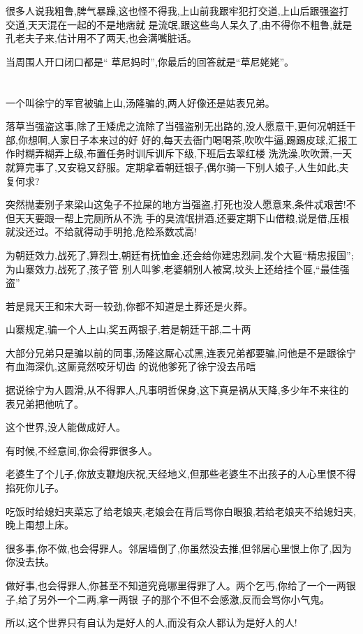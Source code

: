 ﻿\documentclass[12pt]{article}
\begin{document}
很多人说我粗鲁,脾气暴躁,这也怪不得我,上山前我跟牢犯打交道,上山后跟强盗打交道,天天混在一起的不是地痞就
是流氓,跟这些鸟人呆久了,由不得你不粗鲁,就是孔老夫子来,估计用不了两天,也会满嘴脏话。

当周围人开口闭口都是`` 草尼妈时'',你最后的回答就是``草尼姥姥''。
\section{}

一个叫徐宁的军官被骗上山,汤隆骗的,两人好像还是姑表兄弟。

落草当强盗这事,除了王矮虎之流除了当强盗别无出路的,没人愿意干,更何况朝廷干部,你想啊,人家日子本来过的好
好的,每天去衙门喝喝茶,吹吹牛逼,踢踢皮球,汇报工作时糊弄糊弄上级,布置任务时训斥训斥下级,下班后去翠红楼
洗洗澡,吹吹萧,一天就算完事了,又安稳又舒服。定期拿着朝廷银子,偶尔骑一下别人娘子,人生如此,夫复何求?

突然抛妻别子来梁山这兔子不拉屎的地方当强盗,打死也没人愿意来,条件忒艰苦!不但天天要跟一帮上完厕所从不洗
手的臭流氓拼酒,还要定期下山借粮,说是借,压根就没还过。不给就得动手明抢,危险系数忒高!

为朝廷效力,战死了,算烈士,朝廷有抚恤金,还会给你建忠烈祠,发个大匾``精忠报国'';为山寨效力,战死了,孩子管
别人叫爹,老婆躺别人被窝,坟头上还给挂个匾,``最佳强盗''

若是晁天王和宋大哥一较劲,你都不知道是土葬还是火葬。

山寨规定,骗一个人上山,奖五两银子,若是朝廷干部,二十两

大部分兄弟只是骗以前的同事,汤隆这厮心忒黑,连表兄弟都要骗,问他是不是跟徐宁有血海深仇,这厮竟然咬牙切齿
的说他爹死了徐宁没去吊唁

据说徐宁为人圆滑,从不得罪人,凡事明哲保身,这下真是祸从天降,多少年不来往的表兄弟把他吭了。

这个世界,没人能做成好人。

有时候,不经意间,你会得罪很多人。

老婆生了个儿子,你放支鞭炮庆祝,天经地义,但那些老婆生不出孩子的人心里恨不得掐死你儿子。

吃饭时给媳妇夹菜忘了给老娘夹,老娘会在背后骂你白眼狼,若给老娘夹不给媳妇夹,晚上甭想上床。

很多事,你不做,也会得罪人。邻居墙倒了,你虽然没去推,但邻居心里恨上你了,因为你没去扶。

做好事,也会得罪人,你甚至不知道究竟哪里得罪了人。两个乞丐,你给了一个一两银子,给了另外一个二两,拿一两银
子的那个不但不会感激,反而会骂你小气鬼。

所以,这个世界只有自认为是好人的人,而没有众人都认为是好人的人!
\end{document}
